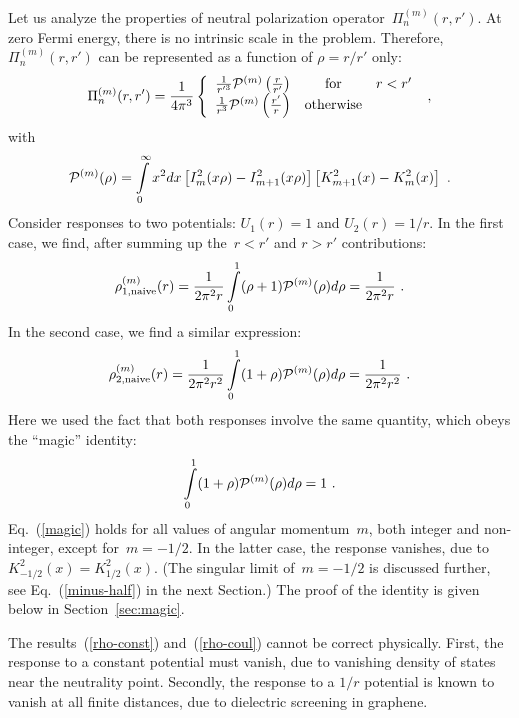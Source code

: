 \documentclass[preprint,aps,prb]{revtex4}
\begin{document}
Let us analyze the properties of neutral polarization
operator~$\Pi_n^{(m)}(r, r')$. At zero Fermi energy, there is no 
intrinsic scale in the problem. Therefore, $\Pi_n^{(m)}(r, r')$
can be represented as a function of $\rho = r/r'$ only: 
\begin{equation}
\Pi_n^{(m)}(r, r') = \frac{1}{4\pi^3} \left\{
\begin{array}{ccc}
\frac{1}{r'^3} {\cal P}^{(m)}\left(\frac{r}{r'}\right) & {\rm for} & r < r' \\
\frac{1}{r^3}  {\cal P}^{(m)}\left(\frac{r'}{r}\right) & {\rm otherwise} &  
\end{array}
\right.
\ , 
\end{equation}
with
\begin{equation}
{\cal P}^{(m)}(\rho) 
=  \int\limits_{0}^{\infty}
    x^2 dx
    \left[I_m^2(x\rho) - I^2_{m + 1}(x\rho) \right]
    \left[K_{m + 1}^2(x) - K^2_{m}(x) \right]
\ .   
\end{equation}
Consider responses to two potentials: $U_1(r) = 1$ and  $U_2(r) = 1/r$. 
In the first case, we 
find, after summing up the~$r < r'$ and $r > r'$ contributions: 
\begin{equation}
\label{rho-const}
\rho^{(m)}_{1, {\rm naive}}(r) = \frac{1}{2\pi^2 r} \int\limits_{0}^{1} 
(\rho + 1) {\cal P}^{(m)}(\rho) d\rho = \frac{1}{2\pi^2 r}
\ .
\end{equation}
In the second case, we find a similar expression:
\begin{equation}
\label{rho-coul}
\rho^{(m)}_{2, {\rm naive}}(r) = \frac{1}{2\pi^2 r^2} \int\limits_{0}^{1} 
(1 + \rho) {\cal P}^{(m)}(\rho) d\rho = \frac{1}{2\pi^2 r^2}
\ .
\end{equation}
Here we used the fact that  both responses involve the same quantity, 
which obeys the ``magic'' identity:
\begin{equation}
\label{magic}
 \int\limits_{0}^{1}
 (1 + \rho) {\cal P}^{(m)}(\rho) d\rho = 1
 \ .
\end{equation}
Eq.~(\ref{magic}) holds
for all values of angular momentum~$m$, both integer and 
non-integer, except for~$m = -1/2$.  
In the latter case,  the response vanishes, 
due to~$K_{-1/2}^2(x) = K_{1/2}^2(x)$. 
(The singular limit of~$m = -1/2$ is discussed further,
see Eq.~(\ref{minus-half}) in the next Section.)
The proof of the identity is given below in Section~\ref{sec:magic}. 


The results~(\ref{rho-const}) and~(\ref{rho-coul}) 
cannot be correct physically. First, the response to a
constant potential must vanish, due to vanishing density of states 
near the neutrality point. Secondly, the response to a $1/r$ potential
is known to vanish at all finite distances, due to dielectric screening
in graphene. 
\end{document}

